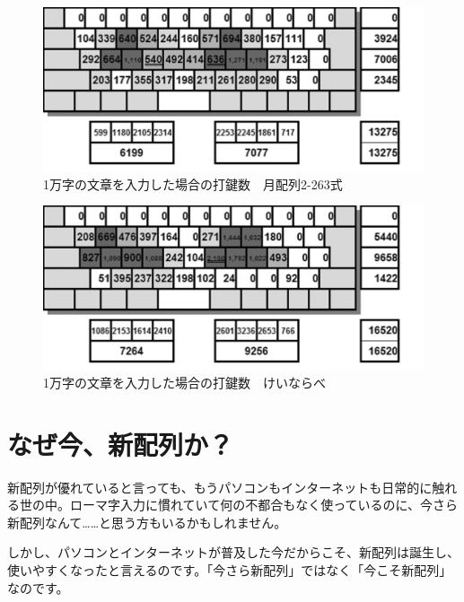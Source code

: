 \begin{figure}
 \begin{center}
   \includegraphics[width=14cm,clip]{res_kouy/dakensuu_tuki2-263.eps}
 \end{center}
 \caption{1万字の文章を入力した場合の打鍵数　月配列2-263式}
 \label{dakensuu_tuki2-263}
\end{figure}

\begin{figure}
 \begin{center}
   \includegraphics[width=14cm,clip]{res_kouy/dakensuu_keinarabe.eps}
 \end{center}
 \caption{1万字の文章を入力した場合の打鍵数　けいならべ}
 \label{dakensuu_keinarabe}
\end{figure}

\section{なぜ今、新配列か？}

新配列が優れていると言っても、もうパソコンもインターネットも日常的に触れる世の中。ローマ字入力に慣れていて何の不都合もなく使っているのに、今さら新配列なんて……と思う方もいるかもしれません。

しかし、パソコンとインターネットが普及した今だからこそ、新配列は誕生し、使いやすくなったと言えるのです。「今さら新配列」ではなく「今こそ新配列」なのです。

